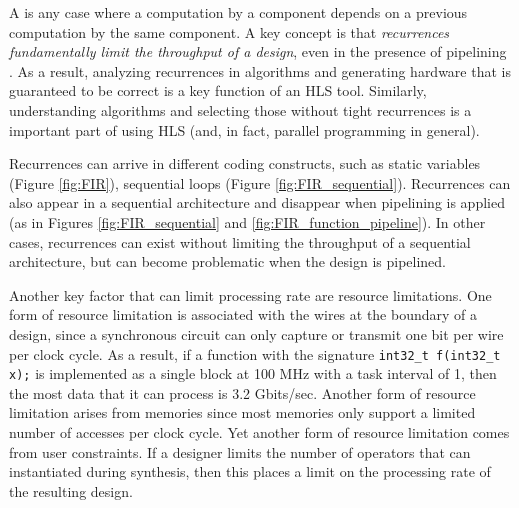 
A  is any case where a computation by a component depends on a previous computation by the same component.  A key concept is that {\em recurrences fundamentally limit the throughput of a design}, even in the presence of pipelining \cite{papaefthymiou91,leiserson93}.  As a result, analyzing recurrences in algorithms and generating hardware that is guaranteed to be correct is a key function of an HLS tool.  Similarly, understanding algorithms and selecting those without tight recurrences is a important part of using HLS (and, in fact, parallel programming in general).

Recurrences can arrive in different coding constructs, such as static variables (Figure \ref{fig:FIR}), sequential loops (Figure \ref{fig:FIR_sequential}).  Recurrences can also appear in a sequential architecture and disappear when pipelining is applied (as in Figures \ref{fig:FIR_sequential} and \ref{fig:FIR_function_pipeline}).  In other cases, recurrences can exist without limiting the throughput of a sequential architecture, but can become problematic when the design is pipelined.


%


Another key factor that can limit processing rate are resource limitations.  One form of resource limitation is associated with the wires at the boundary of a design, since a synchronous circuit can only capture or transmit one bit per wire per clock cycle.  As a result, if a function with the signature \lstinline|int32_t f(int32_t x);| is implemented as a single block at 100 MHz with a task interval of 1, then the most data that it can process is 3.2 Gbits/sec. Another form of resource limitation arises from memories since most memories only support a limited number of accesses per clock cycle.  Yet another form of resource limitation comes from user constraints.  If a designer limits the number of operators that can instantiated during synthesis, then this places a limit on the processing rate of the resulting design.

